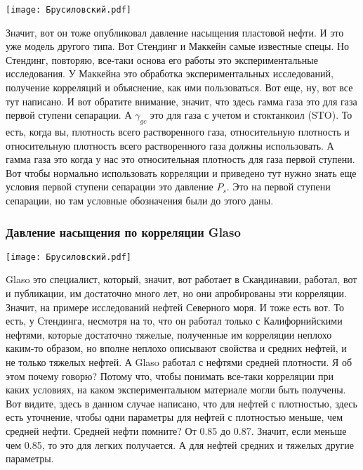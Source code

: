 \documentclass[main.tex]{subfiles}
\begin{document}
\begin{center}
\texttt{[image: Брусиловский.pdf]}
\end{center}

Значит, вот он тоже опубликовал давление насыщения пластовой нефти.
И это уже модель другого типа.
Вот Стендинг и Маккейн самые известные спецы.
Но Стендинг, повторяю, все-таки основа его работы это экспериментальные исследования.
У Маккейна это обработка экспериментальных исследований, получение корреляций и объяснение, как ими пользоваться. Вот еще, ну, вот все тут написано.
И вот обратите внимание, значит, что здесь гамма газа это для газа первой ступени сепарации.
А $\gamma_{gc}$ это для газа с учетом и стоктанкоил (STO).
То есть, когда вы, плотность всего растворенного газа, относительную плотность и относительную плотность всего растворенного газа должны использовать.
А гамма газа это когда у нас это относительная плотность для газа первой ступени.
Вот чтобы нормально использовать корреляции и приведено тут нужно знать еще условия первой ступени сепарации это давление $P_s$.
Это на первой ступени сепарации, но там условные обозначения были до этого даны.

\subsubsection{Давление насыщения по корреляции Glaso}

\begin{center}
\texttt{[image: Брусиловский.pdf]}
\end{center}

Glaso это специалист, который, значит, вот работает в Скандинавии, работал, вот и публикации, им достаточно много лет, но они апробированы эти корреляции.
Значит, на примере исследований нефтей Северного моря.
И тоже есть вот.
То есть, у Стендинга, несмотря на то, что он работал только с Калифорнийскими нефтями, которые достаточно тяжелые, полученные им корреляции неплохо каким-то образом, но вполне неплохо описывают свойства и средних нефтей, и не только тяжелых нефтей.
А Glaso работал с нефтями средней плотности.
Я об этом почему говорю?
Потому что, чтобы понимать все-таки корреляции при каких условиях, на каком экспериментальном материале могли быть получены.
Вот видите, здесь в данном случае написано, что для нефтей с плотностью, здесь есть уточнение, чтобы одни параметры для нефтей с плотностью меньше, чем средней нефти.
Средней нефти помните?
От 0.85 до 0.87.
Значит, если меньше чем 0.85, то это для легких получается.
А для нефтей средних и тяжелых другие параметры.
\end{document}
